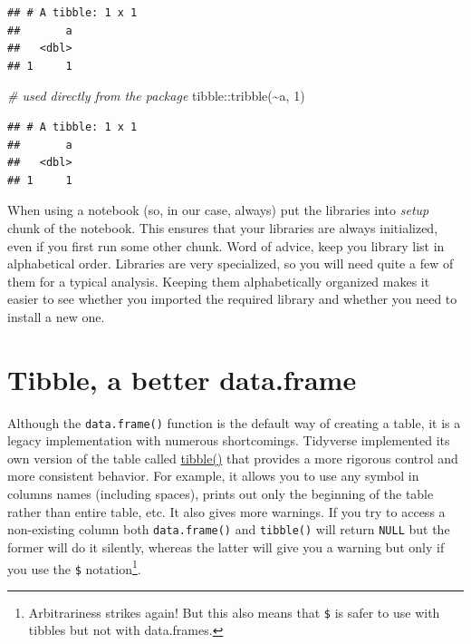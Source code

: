 \documentclass[
]{book}
\newenvironment{Shaded}{\begin{snugshade}}{\end{snugshade}}
\newcommand{\CommentTok}[1]{\textcolor[rgb]{0.56,0.35,0.01}{\textit{#1}}}
\newcommand{\DecValTok}[1]{\textcolor[rgb]{0.00,0.00,0.81}{#1}}
\newcommand{\FunctionTok}[1]{\textcolor[rgb]{0.00,0.00,0.00}{#1}}
\newcommand{\NormalTok}[1]{#1}
\newcommand{\SpecialCharTok}[1]{\textcolor[rgb]{0.00,0.00,0.00}{#1}}
\begin{document}
\begin{verbatim}
## # A tibble: 1 x 1
##       a
##   <dbl>
## 1     1
\end{verbatim}

\begin{Shaded}
\begin{Highlighting}[]
\CommentTok{\# used directly from the package}
\NormalTok{tibble}\SpecialCharTok{::}\FunctionTok{tribble}\NormalTok{(}\SpecialCharTok{\textasciitilde{}}\NormalTok{a, }\DecValTok{1}\NormalTok{)}
\end{Highlighting}
\end{Shaded}

\begin{verbatim}
## # A tibble: 1 x 1
##       a
##   <dbl>
## 1     1
\end{verbatim}

When using a notebook (so, in our case, always) put the libraries into \emph{setup} chunk of the notebook. This ensures that your libraries are always initialized, even if you first run some other chunk. Word of advice, keep you library list in alphabetical order. Libraries are very specialized, so you will need quite a few of them for a typical analysis. Keeping them alphabetically organized makes it easier to see whether you imported the required library and whether you need to install a new one.

\hypertarget{tibble}{%
\section{Tibble, a better data.frame}\label{tibble}}

Although the \texttt{data.frame()} function is the default way of creating a table, it is a legacy implementation with numerous shortcomings. Tidyverse implemented its own version of the table called \href{https://tibble.tidyverse.org/}{tibble()} that provides a more rigorous control and more consistent behavior. For example, it allows you to use any symbol in columns names (including spaces), prints out only the beginning of the table rather than entire table, etc. It also gives more warnings. If you try to access a non-existing column both \texttt{data.frame()} and \texttt{tibble()} will return \texttt{NULL} but the former will do it silently, whereas the latter will give you a warning but only if you use the \texttt{\$} notation\footnote{Arbitrariness strikes again! But this also means that \texttt{\$} is safer to use with tibbles but not with data.frames.}.
\end{document}
